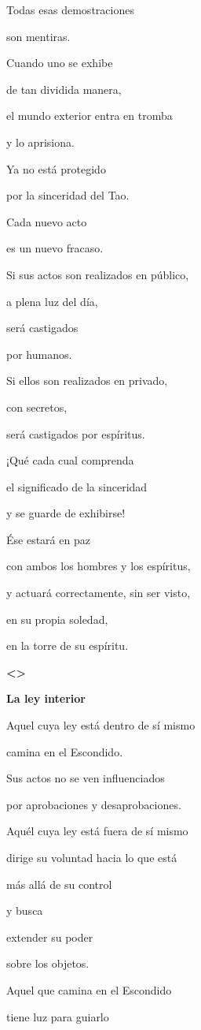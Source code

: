 Todas esas demostraciones

son mentiras.

Cuando uno se exhibe

de tan dividida manera,

el mundo exterior entra en tromba

y lo aprisiona.

Ya no está protegido

por la sinceridad del Tao.

Cada nuevo acto

es un nuevo fracaso.

Si sus actos son realizados en público,

a plena luz del día,

será castigados

por humanos.

Si ellos son realizados en privado,

con secretos,

será castigados por espíritus.

¡Qué cada cual comprenda

el significado de la sinceridad

y se guarde de exhibirse!

Ése estará en paz

con ambos los hombres y los espíritus,

y actuará correctamente, sin ser visto,

en su propia soledad,

en la torre de su espíritu.

\textbf{\textless\textgreater{}}

\textbf{{La ley interior}}

Aquel cuya ley está dentro de sí mismo

camina en el Escondido.

Sus actos no se ven influenciados

por aprobaciones y desaprobaciones.

Aquél cuya ley está fuera de sí mismo

dirige su voluntad hacia lo que está

más allá de su control

y busca

extender su poder

sobre los objetos.

Aquel que camina en el Escondido

tiene luz para guiarlo

